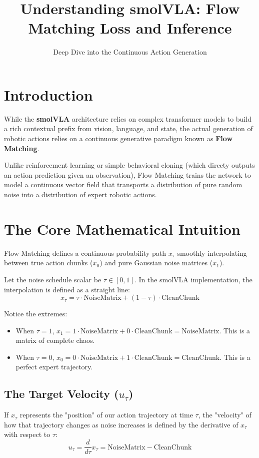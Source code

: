\documentclass[11pt,a4paper]{article}
\title{\textbf{Understanding smolVLA: Flow Matching Loss and Inference}}
\author{Deep Dive into the Continuous Action Generation}
\date{\vspace{-5ex}}
\begin{document}
\maketitle

\section{Introduction}
While the \textbf{smolVLA} architecture relies on complex transformer models to build a rich contextual prefix from vision, language, and state, the actual generation of robotic actions relies on a continuous generative paradigm known as \textbf{Flow Matching}.

Unlike reinforcement learning or simple behavioral cloning (which directy outputs an action prediction given an observation), Flow Matching trains the network to model a continuous vector field that transports a distribution of pure random noise into a distribution of expert robotic actions.

\section{The Core Mathematical Intuition}
Flow Matching defines a continuous probability path $x_\tau$ smoothly interpolating between true action chunks ($x_0$) and pure Gaussian noise matrices ($x_1$). 

Let the noise schedule scalar be $\tau \in [0, 1]$. In the smolVLA implementation, the interpolation is defined as a straight line:
\[ x_\tau = \tau \cdot \text{NoiseMatrix} + (1 - \tau) \cdot \text{CleanChunk} \]

Notice the extremes:
\begin{itemize}
    \item When $\tau=1$, $x_1 = 1 \cdot \text{NoiseMatrix} + 0 \cdot \text{CleanChunk} = \text{NoiseMatrix}$. This is a matrix of complete chaos.
    \item When $\tau=0$, $x_0 = 0 \cdot \text{NoiseMatrix} + 1 \cdot \text{CleanChunk} = \text{CleanChunk}$. This is a perfect expert trajectory.
\end{itemize}

\subsection{The Target Velocity ($u_\tau$)}
If $x_\tau$ represents the "position" of our action trajectory at time $\tau$, the "velocity" of how that trajectory changes as noise increases is defined by the derivative of $x_\tau$ with respect to $\tau$:
\[ u_\tau = \frac{d}{d\tau} x_\tau = \text{NoiseMatrix} - \text{CleanChunk} \]
\end{document}
